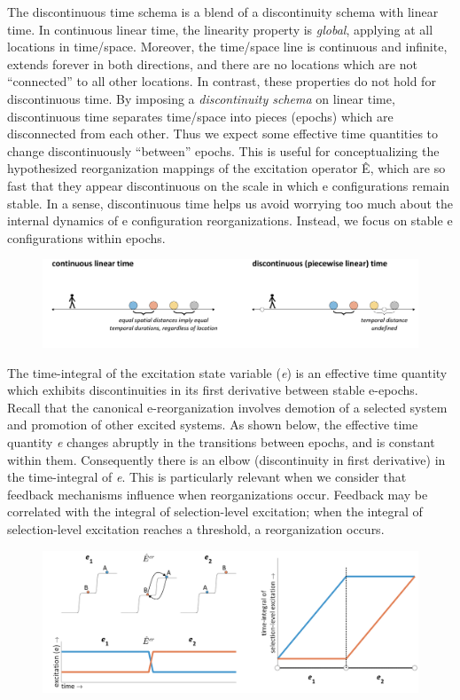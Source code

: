 The discontinuous time schema is a blend of a discontinuity schema with linear time. In continuous linear time, the linearity property is \textit{global}, applying at all locations in time/space. Moreover, the time/space line is continuous and infinite, extends forever in both directions, and there are no locations which are not “connected” to all other locations. In contrast, these properties do not hold for discontinuous time. By imposing a \textit{discontinuity schema} on linear time, discontinuous time separates time/space into pieces (epochs) which are disconnected from each other. Thus we expect some effective time quantities to change discontinuously “between” epochs. This is useful for conceptualizing the hypothesized reorganization mappings of the excitation operator Ê, which are so fast that they appear discontinuous on the scale in which e configurations remain stable. In a sense, discontinuous time helps us avoid worrying too much about the internal dynamics of e configuration reorganizations. Instead, we focus on stable e configurations within epochs.

  
\begin{figure}
\includegraphics[width=\textwidth]{figures/Tilsen-img49.png}
\caption{\missingcaption}
\label{fig:3:21}
\end{figure}
 

  The time-integral of the excitation state variable (\textit{e}) is an effective time quantity which exhibits discontinuities in its first derivative between stable e-epochs. Recall that the canonical e-reorganization involves demotion of a selected system and promotion of other excited systems. As shown below, the effective time quantity \textit{e} changes abruptly in the transitions between epochs, and is constant within them. Consequently there is an elbow (discontinuity in first derivative) in the time-integral of \textit{e}. This is particularly relevant when we consider that feedback mechanisms influence when reorganizations occur. Feedback may be correlated with the integral of selection-level excitation; when the integral of selection-level excitation reaches a threshold, a reorganization occurs.

  
\begin{figure}
\includegraphics[width=\textwidth]{figures/Tilsen-img50.png}
\caption{\missingcaption}
\label{fig:3:22}
\end{figure}
 

